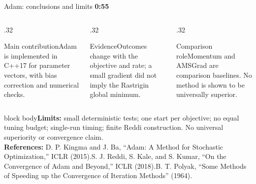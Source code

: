 \documentclass[aspectratio=169,10pt]{beamer}
\newcommand{\timing}[1]{\hfill{\color{teal}\scriptsize\bfseries #1}}
\begin{document}
\begin{frame}{Adam: conclusions and limits \timing{0:55}}
\begin{columns}[T,onlytextwidth]\begin{column}{.32\textwidth}\begin{block}{Main contribution}\small Adam is implemented in C++17 for parameter vectors, with bias correction and numerical checks.\end{block}\end{column}\begin{column}{.32\textwidth}\begin{block}{Evidence}\small Outcomes change with the objective and rate; a small gradient did not imply the Rastrigin global minimum.\end{block}\end{column}\begin{column}{.32\textwidth}\begin{block}{Comparison role}\small Momentum and AMSGrad are comparison baselines. No method is shown to be universally superior.\end{block}\end{column}\end{columns}\vspace{.1cm}
\begin{beamercolorbox}[rounded=true,sep=.45em,wd=\textwidth]{block body}\scriptsize\textbf{Limits:} small deterministic tests; one start per objective; no equal tuning budget; single-run timing; finite Reddi construction. No universal superiority or convergence claim.\\[.2em]\textbf{References:} D. P. Kingma and J. Ba, ``Adam: A Method for Stochastic Optimization,'' ICLR (2015).\quad S. J. Reddi, S. Kale, and S. Kumar, ``On the Convergence of Adam and Beyond,'' ICLR (2018).\quad B. T. Polyak, ``Some Methods of Speeding up the Convergence of Iteration Methods'' (1964).\end{beamercolorbox}\vspace{.35cm}\par{}
\end{frame}
\end{document}
